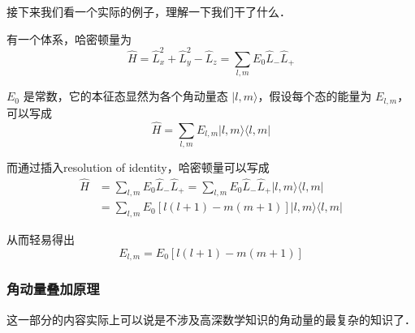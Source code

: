 接下来我们看一个实际的例子，理解一下我们干了什么．

\begin{example}{}
有一个体系，哈密顿量为
\begin{equation}
\hat H = \hat L_x^2 + \hat L_y^2 -\hat  L_z = \sum_{l,m} E_0 \hat L_-\hat L_+
\end{equation}

$E_0$ 是常数，它的本征态显然为各个角动量态 $|l,m\rangle$，假设每个态的能量为 $E_{l,m}$，可以写成
\begin{equation}
\hat H = \sum_{l,m}E_{l,m}|l,m\rangle\langle l,m|
\end{equation}

而通过插入resolution of identity，哈密顿量可以写成
\begin{equation}
\begin{split}
\hat H &= \sum_{l,m} E_0 \hat L_-\hat L_+ = \sum_{l,m} E_0 \hat L_-\hat L_+ |l,m\rangle \langle l,m|\\ &= \sum_{l,m} E_0 \left[l(l+1)-m(m+1)\right]|l,m\rangle \langle l,m|
\end{split}
\end{equation}

从而轻易得出
\begin{equation}
E_{l,m} = E_0 \left[l(l+1)-m(m+1)\right]
\end{equation}
\end{example}

\subsubsection{角动量叠加原理}

这一部分的内容实际上可以说是不涉及高深数学知识的角动量的最复杂的知识了．

